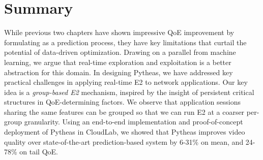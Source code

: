 













%



\section{Summary}
\label{sec:pytheas:summary}

While previous two chapters have shown impressive QoE 
improvement by formulating \ddn as a prediction process, 
they have key limitations 
that curtail the potential of data-driven optimization.
Drawing on a parallel from machine learning, we
argue that real-time exploration and exploitation is a better
abstraction for this domain. In designing Pytheas, we have
addressed key practical challenges in applying real-time
E2 to network applications. Our key idea is a {\em group-based
E2} mechanism, inspired by the insight of persistent critical structures in
QoE-determining factors. We observe that application sessions sharing
the same features can be grouped so that we can run
E2 at a coarser per-group granularity. Using an end-to-end
implementation and proof-of-concept deployment of
Pytheas in CloudLab, we showed that Pytheas improves
video quality over state-of-the-art prediction-based system
by 6-31\% on mean, and 24-78\% on tail QoE.




